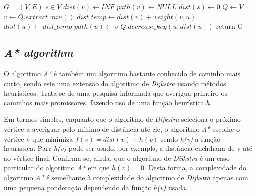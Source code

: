 \documentclass[12pt,a4paper]{report}
\begin{document}
		\begin{center}
			\begin{algorithmic}[1]
				\State $G = (V, E)$
				\State $s \in V$
				\newline
				\Comment{using a priority queue}
				\For{$v \in V$}
					\State $dist(v) \leftarrow INF$
					\State $path(v) \leftarrow NULL$
				\EndFor
				\State $dist(s) \leftarrow 0$
				\State $Q \leftarrow V$
					\State $v \leftarrow Q.extract\_min()$
						\State $dist\_temp \leftarrow dist(v) + weight(v,u)$
							\State $dist(u) \leftarrow dist\_temp$
							\State $path(u) \leftarrow v$
							\State $Q.decrease\_key(u,dist(u))$
						\EndIf
					\EndFor
				\EndWhile
				\State return G
				\EndFunction
			\end{algorithmic}
		\end{center}


		\subsection{\textit{A* algorithm}}
		\label{algo:astar}
		O algoritmo \textit{A*} \cite{astar} é também um algoritmo bastante conhecido de caminho mais curto, sendo este uma extensão do algoritmo de \textit{Dijkstra} usando métodos heurísticos. Trata-se de uma pesquisa informada que averigua primeiro os caminhos mais promissores, fazendo uso de uma função heurística \textit{h}. \par
		Em termos simples, enquanto que o algoritmo de \textit{Dijkstra} seleciona o próximo vértice a averiguar pelo mínimo de distância até ele, o algoritmo \textit{A*} escolhe o vértice v que minimiza \(f(v) = dist(v) + h(v)\) sendo \textit{h(v)} a função heurística. Para \textit{h(v)} pode ser usado, por exemplo, a distância euclidiana de v até ao vértice final. Confirma-se, ainda, que o algoritmo de \textit{Dijkstra} é um caso particular do algoritmo \textit{A*} em que \( h(v) = 0 \). Desta forma, a complexidade do algoritmo \textit{A*} é semelhante à complexidade do algoritmo de \textit{Dijkstra} apenas com uma pequena ponderação dependendo da função \textit{h(v)} usada.
\end{document}
